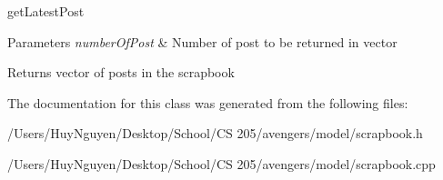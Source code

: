 get\+Latest\+Post 


\begin{DoxyParams}{Parameters}
{\em number\+Of\+Post} & Number of post to be returned in vector \\
\hline
\end{DoxyParams}
\begin{DoxyReturn}{Returns}
vector of posts in the scrapbook 
\end{DoxyReturn}


The documentation for this class was generated from the following files\+:\begin{DoxyCompactItemize}
\item 
/\+Users/\+Huy\+Nguyen/\+Desktop/\+School/\+C\+S 205/avengers/model/scrapbook.\+h\item 
/\+Users/\+Huy\+Nguyen/\+Desktop/\+School/\+C\+S 205/avengers/model/scrapbook.\+cpp\end{DoxyCompactItemize}
